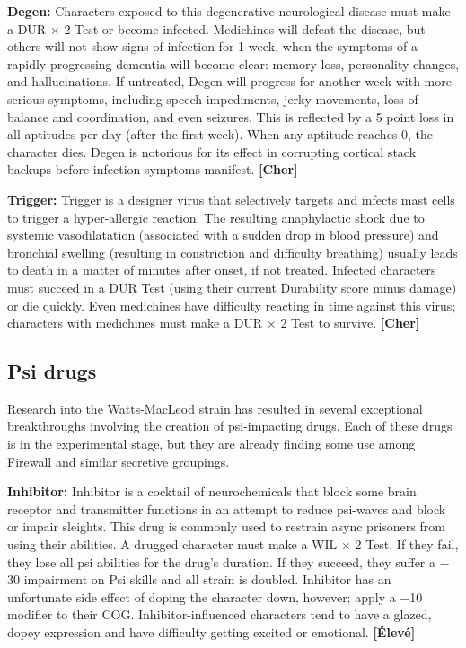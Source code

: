 {{\textbf{Degen:} Characters exposed to this degenerative neurological disease must make a DUR $\times$ 2 Test or become infected. Medichines will defeat the disease, but others will not show signs of infection for 1 week, when the symptoms of a rapidly progressing dementia will become clear: memory loss, personality changes, and hallucinations. If untreated, Degen will progress for another week with more serious symptoms, including speech impediments, jerky movements, loss of balance and coordination, and even seizures. This is reflected by a 5 point loss in all aptitudes per day (after the first week). When any aptitude reaches 0, the character dies. Degen is notorious for its effect in corrupting cortical stack backups before infection symptoms manifest. \textbf{[Cher]} 

\textbf{Trigger:} Trigger is a designer virus that selectively targets and infects mast cells to trigger a hyper-allergic reaction. The resulting anaphylactic shock due to systemic vasodilatation (associated with a sudden drop in blood pressure) and bronchial swelling (resulting in constriction and difficulty breathing) usually leads to death in a matter of minutes after onset, if not treated. Infected characters must succeed in a DUR Test (using their current Durability score minus damage) or die quickly. Even medichines have difficulty reacting in time against this virus; characters with medichines must make a DUR $\times$ 2 Test to survive. \textbf{[Cher]} 



\subsection{Psi drugs} \label{sec:psi-drugs} 

Research into the Watts-MacLeod strain has resulted in several exceptional breakthroughs involving the creation of psi-impacting drugs. Each of these drugs is in the experimental stage, but they are already finding some use among Firewall and similar secretive groupings. 

\textbf{Inhibitor:} Inhibitor is a cocktail of neurochemicals that block some brain receptor and transmitter functions in an attempt to reduce psi-waves and block or impair sleights. This drug is commonly used to restrain async prisoners from using their abilities. A drugged character must make a WIL $\times$ 2 Test. If they fail, they lose all psi abilities for the drug’s duration. If they succeed, they suffer a $-$30 impairment on Psi skills and all strain is doubled. Inhibitor has an unfortunate side effect of doping the character down, however; apply a $-$10 modifier to their COG. Inhibitor-influenced characters tend to have a glazed, dopey expression and have difficulty getting excited or emotional. \textbf{[Élevé]} 

}}
